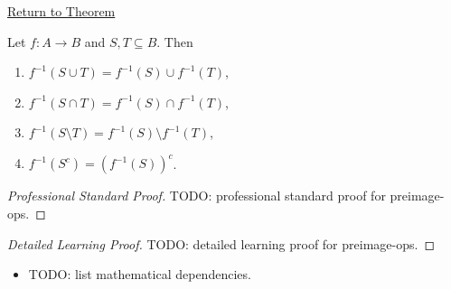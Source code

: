\newpage
{}
\label{prf:preimage-ops}

\begin{remark*}[Return]
\hyperref[thm:preimage-ops]{Return to Theorem}
\end{remark*}

\begin{theorem*}
Let $f : A \to B$ and $S, T \subseteq B$. Then
\begin{enumerate}[label=(\roman*)]
\item $f^{-1}(S \cup T) = f^{-1}(S) \cup f^{-1}(T)$,
\item $f^{-1}(S \cap T) = f^{-1}(S) \cap f^{-1}(T)$,
\item $f^{-1}(S \setminus T) = f^{-1}(S) \setminus f^{-1}(T)$,
\item $f^{-1}(S^c) = (f^{-1}(S))^c$.
\end{enumerate}
\end{theorem*}

\begin{proof}[Professional Standard Proof]
\LRAProofBodyStart
TODO: professional standard proof for preimage-ops.
\end{proof}

\begin{proof}[Detailed Learning Proof]
\LRAProofBodyStart
TODO: detailed learning proof for preimage-ops.
\end{proof}

\begin{remark*}
\end{remark*}

\begin{dependencies}
\begin{itemize}
  \item TODO: list mathematical dependencies.
\end{itemize}
\end{dependencies}

\clearpage
